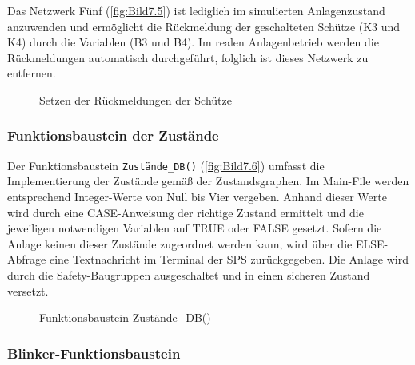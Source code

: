 Das Netzwerk Fünf (\autoref{fig:Bild7.5}) ist lediglich im simulierten Anlagenzustand anzuwenden und ermöglicht die Rückmeldung der geschalteten Schütze (K3 und K4) durch die Variablen (B3 und B4). Im realen Anlagenbetrieb werden die Rückmeldungen automatisch durchgeführt, folglich ist dieses Netzwerk zu entfernen.

\begin{figure}[H]
   \centering
   \caption[Setzen der Rückmeldungen der Schütze]{Setzen der Rückmeldungen der Schütze}
   \label{fig:Bild7.5}
\end{figure}

\subsubsection{Funktionsbaustein der Zustände}

Der Funktionsbaustein \texttt{Zustände_DB()} (\autoref{fig:Bild7.6}) umfasst die Implementierung der Zustände gemäß der Zustandsgraphen. Im Main-File werden entsprechend Integer-Werte von Null bis Vier vergeben. Anhand dieser Werte wird durch eine CASE-Anweisung der richtige Zustand ermittelt und die jeweiligen notwendigen Variablen auf TRUE oder FALSE gesetzt. Sofern die Anlage keinen dieser Zustände zugeordnet werden kann, wird über die ELSE-Abfrage eine Textnachricht im Terminal der SPS zurückgegeben. Die Anlage wird durch die Safety-Baugruppen ausgeschaltet und in einen sicheren Zustand versetzt.

\begin{figure}[H]
   \centering
   \caption[Funktionsbaustein Zustände\_DB()]{Funktionsbaustein Zustände\_DB()}
   \label{fig:Bild7.6}
\end{figure}

\subsubsection{Blinker-Funktionsbaustein}

